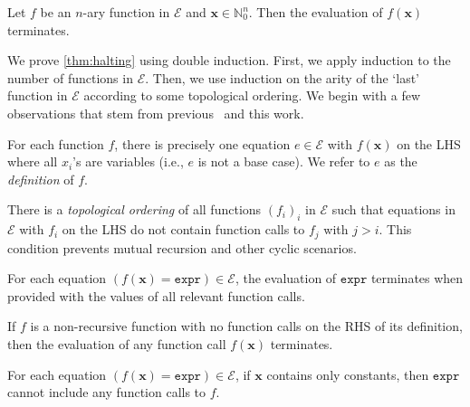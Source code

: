 \documentclass[a4paper,UKenglish,cleveref, autoref, thm-restate]{lipics-v2021}
\newcommand{\expr}{\mathtt{expr}}
\begin{document}
\begin{theorem}[Termination]\label{thm:halting}
  Let $f$ be an $n$-ary function in $\mathcal{E}$ and
  $\mathbf{x} \in \mathbb{N}_{0}^{n}$. Then the evaluation of $f(\mathbf{x})$
  terminates.
\end{theorem}

We prove \cref{thm:halting} using double induction. First, we apply induction to
the number of functions in $\mathcal{E}$. Then, we use induction on the arity of
the `last' function in $\mathcal{E}$ according to some topological ordering. We
begin with a few observations that stem from
previous~\cite{DBLP:conf/kr/DilkasB23,DBLP:conf/ijcai/BroeckTMDR11} and this
work.

\begin{observation}\label{assumption1}
  For each function $f$, there is precisely one equation $e \in \mathcal{E}$
  with $f(\mathbf{x})$ on the LHS where all $x_{i}$'s are variables (i.e., $e$
  is not a base case). We refer to $e$ as the \emph{definition} of $f$.
\end{observation}

\begin{observation}\label{assumption2}
  There is a \emph{topological ordering} of all functions ${(f_{i})}_{i}$ in
  $\mathcal{E}$ such that equations in $\mathcal{E}$ with $f_{i}$ on the LHS do
  not contain function calls to $f_{j}$ with $j > i$. This condition prevents
  mutual recursion and other cyclic scenarios.
\end{observation}

\begin{observation}\label{assumption3}
  For each equation $(f(\mathbf{x}) = \expr) \in \mathcal{E}$, the evaluation
  of $\expr$ terminates when provided with the values of all relevant function
  calls.
\end{observation}

\begin{corollary}\label{fact}
  If $f$ is a non-recursive function with no function calls on the RHS of its
  definition, then the evaluation of any function call $f(\mathbf{x})$
  terminates.
\end{corollary}

\begin{observation}\label{fact2}
  For each equation $(f(\mathbf{x}) = \expr{}) \in \mathcal{E}$, if $\mathbf{x}$
  contains only constants, then $\expr{}$ cannot include any function calls to
  $f$.
\end{observation}
\end{document}
